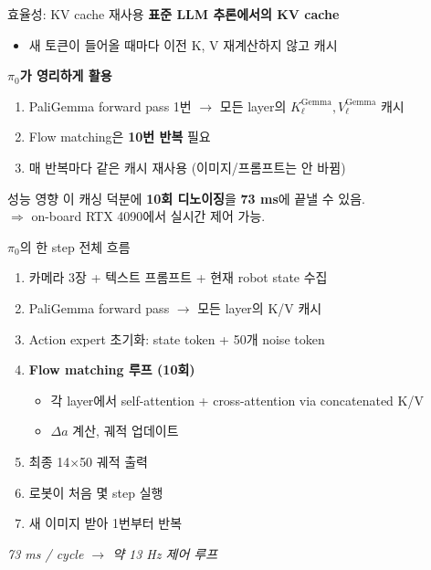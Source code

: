 \documentclass[aspectratio=169,10pt]{beamer}
\begin{document}
\begin{frame}{효율성: KV cache 재사용}
\textbf{표준 LLM 추론에서의 KV cache}
\begin{itemize}
  \item 새 토큰이 들어올 때마다 이전 K, V 재계산하지 않고 캐시
\end{itemize}

\vspace{0.6em}
\textbf{$\pi_0$가 영리하게 활용}
\begin{enumerate}
  \item PaliGemma forward pass 1번 $\to$ 모든 layer의 $K^{\text{Gemma}}_\ell, V^{\text{Gemma}}_\ell$ 캐시
  \item Flow matching은 \textbf{10번 반복} 필요
  \item 매 반복마다 \alert{같은 캐시 재사용} (이미지/프롬프트는 안 바뀜)
\end{enumerate}

\vspace{0.6em}
\begin{block}{성능 영향}
이 캐싱 덕분에 \textbf{10회 디노이징}을 \textbf{73 ms}에 끝낼 수 있음.\\
$\Rightarrow$ on-board RTX 4090에서 실시간 제어 가능.
\end{block}
\end{frame}

\begin{frame}{$\pi_0$의 한 step 전체 흐름}
\begin{enumerate}
  \item 카메라 3장 + 텍스트 프롬프트 + 현재 robot state 수집
  \item PaliGemma forward pass $\to$ 모든 layer의 K/V 캐시
  \item Action expert 초기화: state token + 50개 noise token
  \item \textbf{Flow matching 루프 (10회)}
    \begin{itemize}
      \footnotesize
      \item 각 layer에서 self-attention + cross-attention via concatenated K/V
      \item $\Delta a$ 계산, 궤적 업데이트
    \end{itemize}
  \item 최종 14$\times$50 궤적 출력
  \item 로봇이 처음 몇 step 실행
  \item 새 이미지 받아 1번부터 반복
\end{enumerate}

\vspace{0.6em}
\centering
\textit{73 ms / cycle $\to$ 약 13 Hz 제어 루프}
\end{frame}
\end{document}
